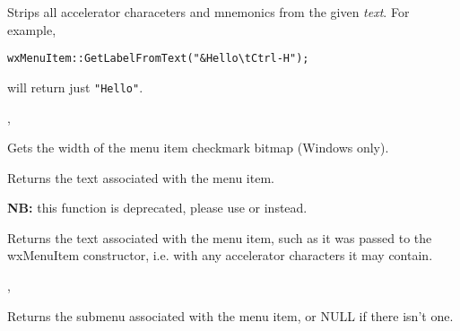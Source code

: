 \label{wxmenuitemgetlabelfromtext}


Strips all accelerator characeters and mnemonics from the given {\it text}.
For example,

\begin{verbatim}
wxMenuItem::GetLabelFromText("&Hello\tCtrl-H");
\end{verbatim}

will return just {\tt "Hello"}.


,

\label{wxmenuitemgetmarginwidth}


Gets the width of the menu item checkmark bitmap (Windows only).

\label{wxmenuitemgetname}


Returns the text associated with the menu item.

{\bf NB:} this function is deprecated, please use 
 or  
instead.

\label{wxmenuitemgettext}


Returns the text associated with the menu item, such as it was passed to the
wxMenuItem constructor, i.e. with any accelerator characters it may contain.


,

\label{wxmenuitemgetsubmenu}


Returns the submenu associated with the menu item, or NULL if there isn't one.

\label{wxmenuitemgettextcolour}


